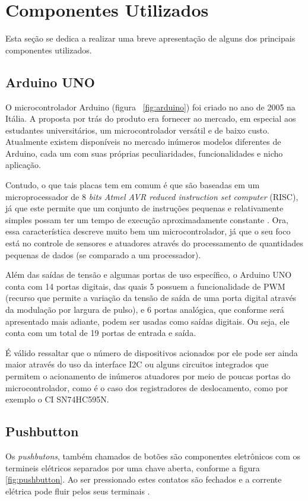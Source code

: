 \documentclass[conference]{IEEEtran}
\begin{document}
\section{Componentes Utilizados}
Esta seção se dedica a realizar uma breve apresentação de alguns dos principais componentes utilizados.

\subsection{Arduino UNO}
O microcontrolador Arduino (figura ~\ref{fig:arduino}) foi criado no ano de 2005 na Itália. A proposta por trás do produto era fornecer ao mercado,
em especial aos estudantes universitários, um microcontrolador versátil e de baixo custo. Atualmente existem disponíveis 
no mercado inúmeros modelos diferentes de Arduino, cada um com suas próprias peculiaridades, funcionalidades e nicho
aplicação.

Contudo, o que tais placas tem em comum é que são baseadas em um microprocessador de 8 
\textit{bits Atmel AVR reduced instruction set computer} 
(RISC), já que este permite que um conjunto de instruções pequenas e relativamente simples possam ter 
um tempo de execução aproximadamente constante \cite{evans2013arduino}. Ora, essa característica descreve 
muito bem um microcontrolador, já que o seu foco está no controle de sensores e atuadores através do processamento 
de quantidades pequenas de dados (se comparado a um processador).

Além das saídas de tensão e algumas portas de uso específico, o Arduino UNO conta com 14 portas digitais,
das quais 5 possuem a funcionalidade de PWM (recurso que permite a variação da tensão de saída de uma 
porta digital através da modulação por largura de pulso), e 6 portas analógica, que conforme será apresentado
mais adiante, podem ser usadas como saídas digitais. Ou seja, ele conta com um total de 19 portas de entrada e saída.

É válido ressaltar que o número de dispositivos acionados por ele pode ser ainda maior através do uso
da interface I2C ou alguns circuitos integrados que permitem o acionamento de inúmeros atuadores por 
meio de poucas portas do microcontrolador, como é o caso dos registradores de deslocamento, como por
exemplo o CI SN74HC595N.

\subsection{Pushbutton}
Os \textit{pushbutons}, também chamados de botões são componentes eletrônicos com os termineis elétricos separados por uma chave aberta, conforme a figura \ref{fig:pushbutton}. Ao ser pressionado estes contatos são fechados e a corrente elétrica pode fluir pelos seus terminais \cite{MasterWalkerPushButton}.
\end{document}
